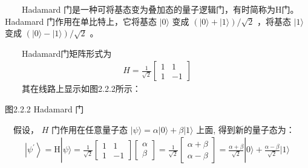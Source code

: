 \documentclass[a4paper,11pt,english]{sphinxmanual}
\begin{document}
\sphinxAtStartPar
{}

\sphinxAtStartPar
{}

\sphinxAtStartPar
  Hadamard 门是一种可将基态变为叠加态的量子逻辑门，有时简称为H门。Hadamard 门作用在单比特上，它将基态 \(|0 \rangle\) 变成 \((|0\rangle +|1\rangle)/\sqrt{2}\) ，将基态 \(|1 \rangle\) 变成 \((|0\rangle -|1\rangle)/\sqrt{2}\) 。

\sphinxAtStartPar
  Hadamard门矩阵形式为
\begin{equation*}
\begin{split}H=\frac{1}{\sqrt{2}}\left[\begin{array}{cc} 1 & 1 \\ 1 & -1 \end{array}\right]\end{split}
\end{equation*}
\sphinxAtStartPar
  其在线路上显示如图2.2.2所示：


\begin{center}图2.2.2 Hadamard 门
\end{center}
\sphinxAtStartPar
 假设， \(H\) 门作用在任意量子态 \(|\psi\rangle=\alpha|0\rangle+\beta|1\rangle\) 上面, 得到新的量子态为：
\begin{equation*}
\begin{split}\left|\psi^{\prime}\right\rangle=\mathrm{H}|\psi\rangle=\frac{1}{\sqrt{2}}\left[\begin{array}{cc} 1 & 1 \\ 1 & -1 \end{array}\right]\left[\begin{array}{l} \alpha \\ \beta \end{array}\right]=\frac{1}{\sqrt{2}}\left[\begin{array}{c} \alpha+\beta \\ \alpha-\beta \end{array}\right]=\frac{\alpha+\beta}{\sqrt{2}}|0\rangle+\frac{\alpha-\beta}{\sqrt{2}}|1\rangle\end{split}
\end{equation*}
\sphinxAtStartPar
{}
\end{document}
